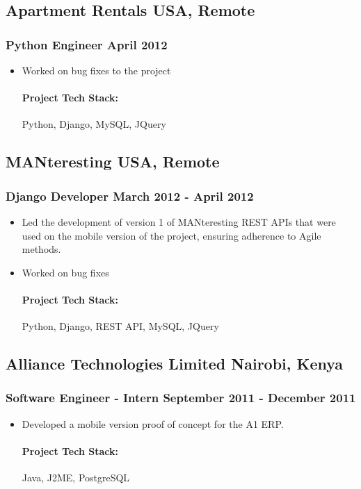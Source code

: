\documentclass[11pt]{article} %
\begin{document}
\subsection{Apartment Rentals \hfill USA, Remote}
\subsubsection{Python Engineer \hfill  April 2012}
\begin{itemize}
    \item Worked on bug fixes to the project
    \paragraph{Project Tech Stack:} Python, Django, MySQL, JQuery
\end{itemize}

\subsection{MANteresting \hfill USA, Remote}
\subsubsection{Django Developer \hfill  March 2012 - April 2012}
\begin{itemize}
    \item Led the development of version 1 of MANteresting REST APIs that were used on the mobile version of the project, ensuring adherence to Agile methods.
    \item Worked on bug fixes
    \paragraph{Project Tech Stack:} Python, Django, REST API, MySQL, JQuery
\end{itemize}

\subsection{Alliance Technologies Limited \hfill Nairobi, Kenya}
\subsubsection{Software Engineer - Intern \hfill  September 2011 - December 2011}
\begin{itemize}
    \item Developed a mobile version proof of concept for the A1 ERP. 
    \paragraph{Project Tech Stack:} Java, J2ME, PostgreSQL
\end{itemize}
\end{document}

